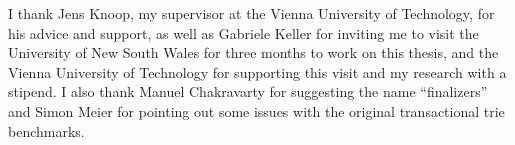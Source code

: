 \begin{acknowledgements*}

I thank Jens Knoop, my supervisor at the Vienna University of Technology, for his advice and support, as well as Gabriele Keller for inviting me to visit the University of New South Wales for three months to work on this thesis, and the Vienna University of Technology for supporting this visit and my research with a stipend.
I also thank Manuel Chakravarty for suggesting the name ``finalizers'' and Simon Meier for pointing out some issues with the original transactional trie benchmarks.

\end{acknowledgements*}

